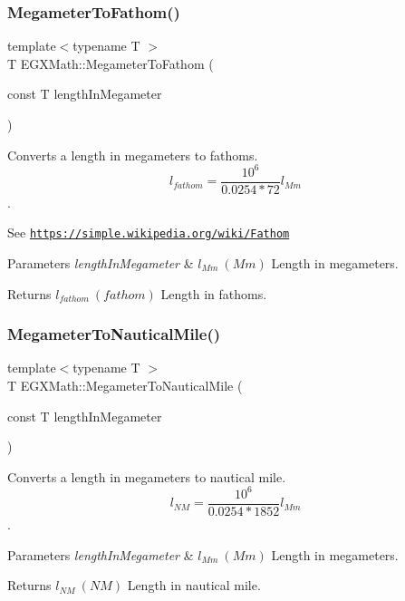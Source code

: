 \subsubsection{\texorpdfstring{Megameter\+To\+Fathom()}{MegameterToFathom()}}
{\footnotesize\ttfamily template$<$typename T $>$ \\
T E\+G\+X\+Math\+::\+Megameter\+To\+Fathom (\begin{DoxyParamCaption}\item[{const T}]{length\+In\+Megameter }\end{DoxyParamCaption})}



Converts a length in megameters to fathoms. \[ l_{fathom}= \frac{10^{6}}{0.0254 * 72} l_{Mm} \]. 

See \href{https://simple.wikipedia.org/wiki/Fathom}{\tt https\+://simple.\+wikipedia.\+org/wiki/\+Fathom} 
\begin{DoxyParams}{Parameters}
{\em length\+In\+Megameter} & $ l_{Mm}\ (Mm)$ Length in megameters. \\
\hline
\end{DoxyParams}
\begin{DoxyReturn}{Returns}
$ l_{fathom}\ (fathom)$ Length in fathoms. 
\end{DoxyReturn}
\mbox{\label{group___e_g_x_math-_conversions-_length_conversions-_megameter-_nautical_ga483b575b1654e1d0f6ea1fac63b5f54e}} 
\subsubsection{\texorpdfstring{Megameter\+To\+Nautical\+Mile()}{MegameterToNauticalMile()}}
{\footnotesize\ttfamily template$<$typename T $>$ \\
T E\+G\+X\+Math\+::\+Megameter\+To\+Nautical\+Mile (\begin{DoxyParamCaption}\item[{const T}]{length\+In\+Megameter }\end{DoxyParamCaption})}



Converts a length in megameters to nautical mile. \[ l_{NM}= \frac{10^{6}}{0.0254 * 1852} l_{Mm} \]. 


\begin{DoxyParams}{Parameters}
{\em length\+In\+Megameter} & $ l_{Mm}\ (Mm)$ Length in megameters. \\
\hline
\end{DoxyParams}
\begin{DoxyReturn}{Returns}
$ l_{NM}\ (NM)$ Length in nautical mile. 
\end{DoxyReturn}
